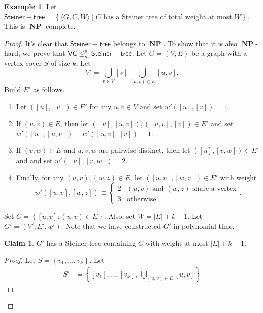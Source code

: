 \documentclass[10pt,letterpaper,cm]{nupset}
\theoremstyle{definition}
\newtheorem{exmp}[definition]{Example}
\theoremstyle{theorem}
\newtheorem*{claim}{Claim}
\theoremstyle{remark}
\newcommand{\1}{\mathbf{1}}
\newcommand{\0}{\vec 0}
\DeclareMathOperator{\NP}{\mathbf{NP}}
\begin{document}
\begin{exmp}
Let $\mathsf{Steiner{-}tree} = \left\{\langle G, C, W \rangle \mid C\text{ has a Steiner tree of total weight at most }W\right\}$. This is $\NP$-complete.
\end{exmp}
\begin{proof}
It's clear that $\mathsf{Steiner{-}tree} $ belongs to  $\NP$. To show that it is also $\NP$-hard, we prove that $\mathsf{VC} \leq_m^p \mathsf{Steiner{-}tree} $. Let $G = \left(V, E\right)$ be a graph with a vertex cover $S$ of size $k$. 
 Let $$V' = \bigcup_{v \in V} \left[v\right] \bigcup_{(u,v) \in E}\left[u,v\right].$$ Build $E'$ as follows. 
\begin{enumerate}[label=(\alph*)]
\item Let $\left(\left[u\right], \left[v\right]\right)\in E'$ for any $u,v \in V$ and set $w'(\left[u\right], \left[v\right])=1$. 
\item If $\left(u,v\right) \in E$, then let $\left(\left[u\right], \left[u,v\right]\right), \left(\left[u,v\right], \left[v\right]\right) \in E'$ and set $w'(\left[u\right], \left[u,v\right]) = w'(\left[u,v\right], \left[v\right]) =1$. 
\item If $\left(v,w\right) \in E$ and $u,v,w$ are pairwise distinct, then let $\left(\left[u\right], \left[v,w\right]\right) \in E'$ and and set $w'(\left[u\right], \left[v,w\right]) = 2$.
\item Finally, for any $\left(u,v\right), \left(w,z\right) \in E$, let $\left(\left[u,v\right], \left[w,z\right]\right)\in E'$  with weight $$w'(\left[u,v\right], \left[w,z\right])\equiv \begin{cases} 2 & \left(u,v\right) \text{ and } \left(w,z\right) \text{ share a vertex} \\ 3 & \text{otherwise} \end{cases}.$$ 
\end{enumerate}
Set $C = \left\{ \left[u,v\right] : \left(u,v\right) \in E\right\}$. Also, set $W= \left\lvert{E}\right\rvert+ k -1$. Let $G' = \left(V', E', w'\right)$. Note that we have constructed $G'$ in polynomial time.
\begin{claim}
$G'$ has a Steiner tree containing $C$ with weight at most $\left\lvert{E}\right\rvert + k -1$.
\end{claim}
\begin{proof}
Let $S = \left\{v_1, \ldots, v_k\right\}$. Let 
\begin{align*}
S' & = \left\{\left[v_1\right], \ldots, \left[v_k\right], \ \bigcup_{\left(u,v\right) \in E}\left[u,v\right]\right\}

\end{align*}
\end{proof}
\end{proof}
\end{document}

